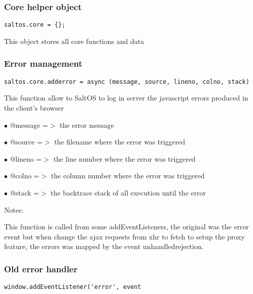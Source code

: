 \documentclass[a4paper]{article}
\begin{document}
\hypertarget{toc691}{}
\subsubsection{Core helper object}

\begin{lstlisting}
saltos.core = {};
\end{lstlisting}

This object stores all core functions and data

\hypertarget{toc692}{}
\subsubsection{Error management}

\begin{lstlisting}
saltos.core.adderror = async (message, source, lineno, colno, stack)
\end{lstlisting}

This function allow to SaltOS to log in server the javascript errors produced in the
client's browser

\begin{compactitem}
\item[\color{myblue}$\bullet$] @message =$>$ the error message
\item[\color{myblue}$\bullet$] @source  =$>$ the filename where the error was triggered
\item[\color{myblue}$\bullet$] @lineno  =$>$ the line number where the error was triggered
\item[\color{myblue}$\bullet$] @colno   =$>$ the column number where the error was triggered
\item[\color{myblue}$\bullet$] @stack   =$>$ the backtrace stack of all execution until the error
\end{compactitem}

Notes:

This function is called from some addEventListeners, the original was the error event
but when change the ajax requests from xhr to fetch to setup the proxy feature, the
errors was mapped by the event unhandledrejection.

\hypertarget{toc693}{}
\subsubsection{Old error handler}

\begin{lstlisting}
window.addEventListener('error', event
\end{lstlisting}
\end{document}
